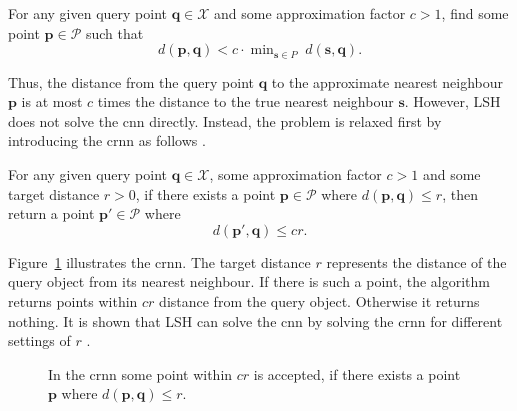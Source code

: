 \documentclass[../../../main.tex]{subfiles}
\begin{document}
\begin{definition}
    For any given query point $\bm{q} \in \mathcal{X}$ and some approximation factor $c > 1$, find some point $\bm{p} \in \mathcal{P}$ such that
    \begin{equation}
        d(\bm{p},\bm{q}) < c \cdot \mathop{\text{min}}_{\bm{s} \in P} \; d(\bm{s}, \bm{q}).
    \end{equation}
\end{definition}

Thus, the distance from the query point $\bm{q}$ to the approximate nearest neighbour $\bm{p}$ is at most $c$ times the distance to the true nearest neighbour $\bm{s}$. However, LSH does not solve the \gls{cnn} directly. Instead, the problem is relaxed first by introducing the \gls{crnn} as follows \cite{indyk_approximate_1998}.

\begin{definition}
    For any given query point $\bm{q} \in \mathcal{X}$, some approximation factor $c > 1$ and some target distance $r > 0$, if there exists a point $\bm{p} \in \mathcal{P}$ where $d(\bm{p},\bm{q}) \leq r$, then return a point $\bm{p}' \in \mathcal{P}$ where
    \begin{equation}
        d(\bm{p}',\bm{q}) \leq cr.
    \end{equation}
\end{definition}

Figure~\ref{fig:nearest_neighbour} illustrates  the \gls{crnn}. The target distance $r$ represents the distance of the query object from its nearest neighbour. If there is such a point, the algorithm returns points within $cr$ distance from the query object. Otherwise it returns nothing. It is shown that LSH can solve the \gls{cnn} by solving the \gls{crnn} for different settings of $r$ \cite{indyk_approximate_1998}.

\begin{figure}[t!]
    \centering
    
    \caption{In the \acrlong{crnn} some point within $cr$ is accepted, if there exists a point $\bm{p}$ where $d(\bm{p},\bm{q}) \leq r$.}
    \label{fig:nearest_neighbour}
\end{figure}
\end{document}
